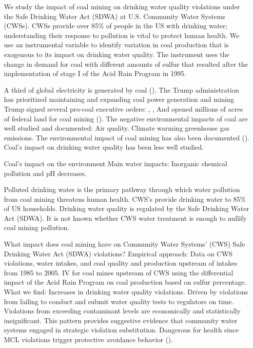 \documentclass{article}
\begin{document}
        
We study the impact of coal mining on drinking water quality violations under the Safe Drinking Water Act (SDWA) at U.S. Community Water Systems (CWSs). CWSs provide over 85\% of people in the US with drinking water; understanding their response to pollution is vital to protect human health. We use an instrumental variable to identify variation in coal production that is exogenous to its impact on drinking water quality. The instrument uses the change in demand for coal with different amounts of sulfur that resulted after the implementation of stage I of the Acid Rain Program in 1995.  
        
A third of global electricity is generated by coal (\cite{IEA2025GER}). The Trump administration has prioritized maintaining and expanding coal power generation and mining Trump signed several pro-coal executive orders: \cite{Trump2025EO14260}, \cite{Trump2025EO14261}, \cite{Trump2025Proc10914} And opened millions of acres of federal land for coal mining (\cite{Daly2025CoalMining}).
The negative environmental impacts of coal are well studied and documented: Air quality.  Climate warming greenhouse gas emissions. The environmental impact of coal mining has also been documented (\cite{muller2011environmental}). Coal's impact on drinking water quality has been less well studied.

Coal's impact on the environment  Main water impacts: Inorganic chemical pollution and  pH decreases.

Polluted drinking water is the primary pathway through which water pollution from coal mining threatens human health. CWS's provide drinking water to 85\% of US households. Drinking water quality is regulated by the Safe Drinking Water Act (SDWA).  It is not known whether CWS water treatment is enough to nullify coal mining pollution.

What impact does coal mining have on Community Water Systems' (CWS) Safe Drinking Water Act (SDWA) violations? Empirical approach: Data on CWS violations, water intakes, and coal quality and production upstream of intakes from 1985 to 2005. IV for coal mines upstream of CWS using the differential impact of the Acid Rain Program on coal production based on sulfur percentage. What we find: Increases in drinking water quality violations. Driven by violations from failing to conduct and submit water quality tests to regulators on time. Violations from exceeding contaminant levels are economically and statistically insignificant. This pattern provides suggestive evidence that community water systems engaged in strategic violation substitution. Dangerous for health since MCL violations trigger protective avoidance behavior (\cite{zivin2011water}).
\end{document}
